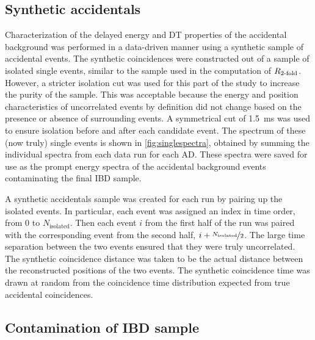 \subsection{Synthetic accidentals}
\label{subsec:synthetic}

Characterization of the delayed energy and DT properties
of the accidental background
was performed in a data-driven manner using
a synthetic sample of accidental events.
The synthetic coincidences were constructed out of a sample of isolated single events,
similar to the sample used in the computation of $R_\text{\ensuremath{2}-fold}$.
However, a stricter isolation cut was used for this part of the study
to increase the purity of the sample.
This was acceptable because the energy and position characteristics of uncorrelated events
by definition did not change based on the presence or absence
of surrounding events.
A symmetrical cut of \SI{1.5}{\ms} was used
to ensure isolation before and after each candidate event.
The spectrum of these (now truly) single events is shown in \cref{fig:singlespectra},
obtained by summing the individual spectra from each data run for each AD.
These spectra were saved for use as the prompt energy spectra
of the accidental background events contaminating the final IBD sample.


A synthetic accidentals sample was created for each run
by pairing up the isolated events.
In particular, each event was assigned an index in time order,
from $0$ to $N_{\text{isolated}}$.
Then each event $i$ from the first half of the run was paired with
the corresponding event from the second half, $i + \nicefrac{N_{\text{isolated}}}{2}$.
The large time separation between the two events
ensured that they were truly uncorrelated.
The synthetic coincidence distance was taken to be the actual distance
between the reconstructed positions of the two events.
The synthetic coincidence time was drawn at random
from the coincidence time distribution
expected from true accidental coincidences.

\subsection{Contamination of IBD sample}
\label{subsec:acc_count}

